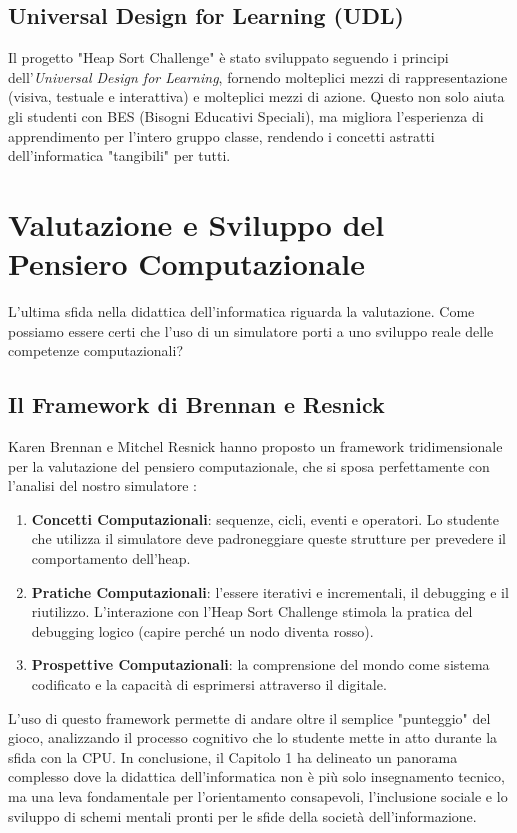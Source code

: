 \documentclass[openany]{theme/uniprthesis}
\begin{document}
\subsection{Universal Design for Learning (UDL)}
Il progetto "Heap Sort Challenge" è stato sviluppato seguendo i principi dell'\textit{Universal Design for Learning}, fornendo molteplici mezzi di rappresentazione (visiva, testuale e interattiva) e molteplici mezzi di azione. Questo non solo aiuta gli studenti con BES (Bisogni Educativi Speciali), ma migliora l'esperienza di apprendimento per l'intero gruppo classe, rendendo i concetti astratti dell'informatica "tangibili" per tutti.

\section{Valutazione e Sviluppo del Pensiero Computazionale}
L'ultima sfida nella didattica dell'informatica riguarda la valutazione. Come possiamo essere certi che l'uso di un simulatore porti a uno sviluppo reale delle competenze computazionali?

\subsection{Il Framework di Brennan e Resnick}
Karen Brennan e Mitchel Resnick hanno proposto un framework tridimensionale per la valutazione del pensiero computazionale, che si sposa perfettamente con l'analisi del nostro simulatore \cite{brennan2012new}:
\begin{enumerate}
    \item \textbf{Concetti Computazionali}: sequenze, cicli, eventi e operatori. Lo studente che utilizza il simulatore deve padroneggiare queste strutture per prevedere il comportamento dell'heap.
    \item \textbf{Pratiche Computazionali}: l'essere iterativi e incrementali, il debugging e il riutilizzo. L'interazione con l'Heap Sort Challenge stimola la pratica del debugging logico (capire perché un nodo diventa rosso).
    \item \textbf{Prospettive Computazionali}: la comprensione del mondo come sistema codificato e la capacità di esprimersi attraverso il digitale.
\end{enumerate}

L'uso di questo framework permette di andare oltre il semplice "punteggio" del gioco, analizzando il processo cognitivo che lo studente mette in atto durante la sfida con la CPU. In conclusione, il Capitolo 1 ha delineato un panorama complesso dove la didattica dell'informatica non è più solo insegnamento tecnico, ma una leva fondamentale per l'orientamento consapevoli, l'inclusione sociale e lo sviluppo di schemi mentali pronti per le sfide della società dell'informazione.
\end{document}

